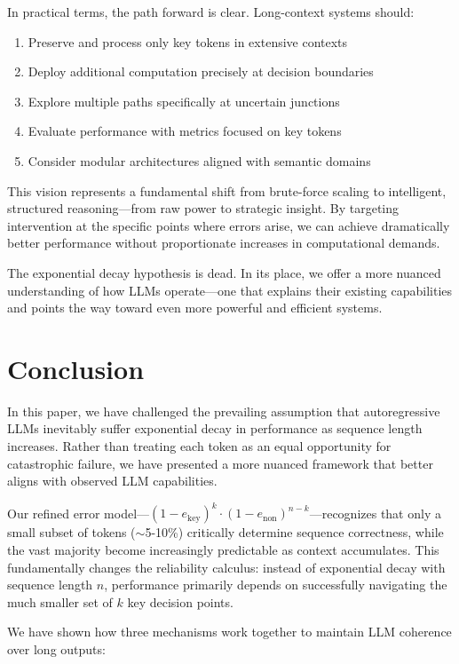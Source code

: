 \documentclass{article}
\begin{document}
In practical terms, the path forward is clear. Long-context systems should:

\begin{enumerate}
\item Preserve and process only key tokens in extensive contexts
\item Deploy additional computation precisely at decision boundaries
\item Explore multiple paths specifically at uncertain junctions
\item Evaluate performance with metrics focused on key tokens
\item Consider modular architectures aligned with semantic domains
\end{enumerate}

This vision represents a fundamental shift from brute-force scaling to intelligent, structured reasoning—from raw power to strategic insight. By targeting intervention at the specific points where errors arise, we can achieve dramatically better performance without proportionate increases in computational demands.

The exponential decay hypothesis is dead. In its place, we offer a more nuanced understanding of how LLMs operate—one that explains their existing capabilities and points the way toward even more powerful and efficient systems.

\section{Conclusion}

In this paper, we have challenged the prevailing assumption that autoregressive LLMs inevitably suffer exponential decay in performance as sequence length increases. Rather than treating each token as an equal opportunity for catastrophic failure, we have presented a more nuanced framework that better aligns with observed LLM capabilities.

Our refined error model—$(1-e_{\text{key}})^k \cdot (1-e_{\text{non}})^{n-k}$—recognizes that only a small subset of tokens ($\sim$5-10\%) critically determine sequence correctness, while the vast majority become increasingly predictable as context accumulates. This fundamentally changes the reliability calculus: instead of exponential decay with sequence length $n$, performance primarily depends on successfully navigating the much smaller set of $k$ key decision points.

We have shown how three mechanisms work together to maintain LLM coherence over long outputs:
\end{document}
